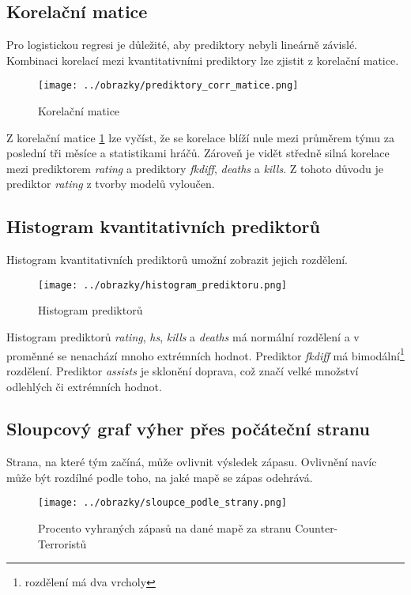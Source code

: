 \newpage
\subsection{Korelační matice}
Pro logistickou regresi je důležité, aby prediktory nebyli lineárně závislé. Kombinaci korelací mezi kvantitativními prediktory lze zjistit z korelační matice.

\begin{figure}[H]
    \centering
    \texttt{[image: ../obrazky/prediktory\_corr\_matice.png]}
    \caption{Korelační matice} 
    \label{fig:korelacni_matice}
\end{figure}

Z korelační matice \ref{fig:korelacni_matice} lze vyčíst, že se korelace blíží nule mezi průměrem týmu za poslední tři měsíce a statistikami hráčů. Zároveň je
vidět středně silná korelace mezi prediktorem \textit{rating} a prediktory \textit{fkdiff}, \textit{deaths} a \textit{kills}. Z tohoto důvodu je
prediktor \textit{rating} z tvorby modelů vyloučen.

\newpage
\subsection{Histogram kvantitativních prediktorů}
Histogram kvantitativních prediktorů umožní zobrazit jejich rozdělení.

\begin{figure}[H]
    \centering
    \texttt{[image: ../obrazky/histogram\_prediktoru.png]}
    \caption{Histogram prediktorů} 
    \label{fig:histogram_prediktoru}
\end{figure}

Histogram prediktorů \textit{rating}, \textit{hs}, \textit{kills} a \textit{deaths} má normální rozdělení a v proměnné se nenachází mnoho extrémních hodnot.
Prediktor \textit{fkdiff} má bimodální\footnote{rozdělení má dva vrcholy} rozdělení. Prediktor \textit{assists} je sklonění doprava, což značí velké množství 
odlehlých či extrémních hodnot.

\newpage
\subsection{Sloupcový graf výher přes počáteční stranu}
Strana, na které tým začíná, může ovlivnit výsledek zápasu. Ovlivnění navíc může být rozdílné podle toho, na jaké mapě se zápas odehrává.

\begin{figure}[H]
    \centering
    \texttt{[image: ../obrazky/sloupce\_podle\_strany.png]}
    \caption{Procento vyhraných zápasů na dané mapě za stranu Counter-Terroristů} 
    \label{fig:sloupcovy_graf_strany}
\end{figure}

